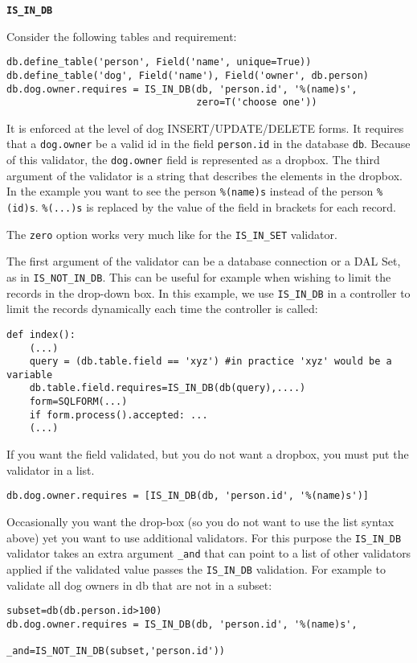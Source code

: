 \documentclass[justified,sixbynine,notoc]{tufte-book}
\def\ft{\small\tt}
\def\inxx#1{\index{#1}}
\begin{document}
\begin{fullwidth}
{\bf {\ft IS\_IN\_DB}}

\inxx{IS\_IN\_DB}

Consider the following tables and requirement:

\begin{lstlisting}
db.define_table('person', Field('name', unique=True))
db.define_table('dog', Field('name'), Field('owner', db.person)
db.dog.owner.requires = IS_IN_DB(db, 'person.id', '%(name)s',
                                 zero=T('choose one'))
\end{lstlisting}

It is enforced at the level of dog INSERT/UPDATE/DELETE forms. It requires that a {\ft dog.owner} be a valid id in the field {\ft person.id} in the database {\ft db}. Because of this validator, the {\ft dog.owner} field is represented as a dropbox. The third argument of the validator is a string that describes the elements in the dropbox. In the example you want to see the person {\ft \%(name)s} instead of the person {\ft \%(id)s}. {\ft \%(...)s} is replaced by the value of the field in brackets for each record.

The {\ft zero} option works very much like for the {\ft IS\_IN\_SET} validator.

The first argument of the validator can be a database connection or a DAL Set, as in {\ft IS\_NOT\_IN\_DB}. This can be useful for example when wishing to limit the records in the drop-down box. In this example, we use {\ft IS\_IN\_DB} in a controller to limit the records dynamically each time the controller is called:

\begin{lstlisting}
def index():
    (...)
    query = (db.table.field == 'xyz') #in practice 'xyz' would be a variable
    db.table.field.requires=IS_IN_DB(db(query),....)
    form=SQLFORM(...)
    if form.process().accepted: ...
    (...)
\end{lstlisting}

If you want the field validated, but you do not want a dropbox, you must put the validator in a list.

\begin{lstlisting}
db.dog.owner.requires = [IS_IN_DB(db, 'person.id', '%(name)s')]
\end{lstlisting}

\inxx{\_and}
Occasionally you want the drop-box (so you do not want to use the list syntax above) yet you want to use additional validators. For this purpose the {\ft IS\_IN\_DB} validator takes an extra argument {\ft \_and} that can point to a list of other validators applied if the validated value passes the {\ft IS\_IN\_DB} validation. For example to validate all dog owners in db that are not in a subset:
\begin{lstlisting}
subset=db(db.person.id>100)
db.dog.owner.requires = IS_IN_DB(db, 'person.id', '%(name)s',
                                 _and=IS_NOT_IN_DB(subset,'person.id'))
\end{lstlisting}


\end{fullwidth}
\end{document}
